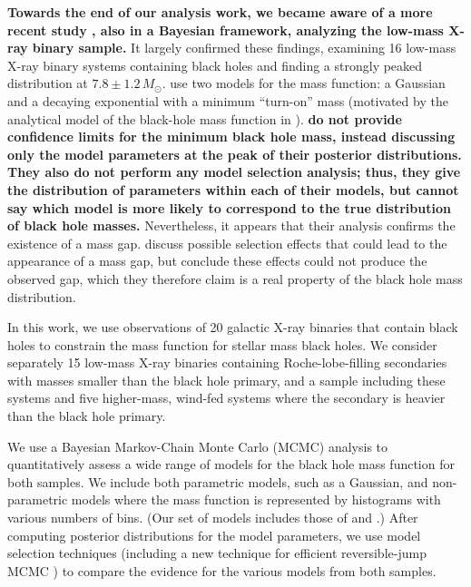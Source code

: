 \documentclass[preprint]{aastex}
\newcommand{\Msun}{M_\odot}
\newcommand{\changed}[1]{{\bf #1 }}
\begin{document}
\changed{Towards the end of our analysis work, we became aware of a
  more recent study \citep{Ozel2010}, also in a Bayesian framework,
  analyzing the low-mass X-ray binary sample.}  It largely confirmed
these findings, examining 16 low-mass X-ray binary systems containing
black holes and finding a strongly peaked distribution at $7.8 \pm 1.2
\, \Msun$.  \citet{Ozel2010} use two models for the mass function: a
Gaussian and a decaying exponential with a minimum ``turn-on'' mass
(motivated by the analytical model of the black-hole mass function in
\citet{Fryer2001}).  \changed{\citet{Ozel2010} do not provide
  confidence limits for the minimum black hole mass, instead
  discussing only the model parameters at the peak of their posterior
  distributions.  They also do not perform any model selection
  analysis; thus, they give the distribution of parameters within each
  of their models, but cannot say which model is more likely to
  correspond to the true distribution of black hole masses.}
Nevertheless, it appears that their analysis confirms the existence of
a mass gap.  \citet{Ozel2010} discuss possible selection effects that
could lead to the appearance of a mass gap, but conclude these effects
could not produce the observed gap, which they therefore claim is a
real property of the black hole mass distribution.

In this work, we use observations of 20 galactic X-ray binaries that
contain black holes to constrain the mass function for stellar mass
black holes.  We consider separately 15 low-mass X-ray binaries
containing Roche-lobe-filling secondaries with masses smaller than the
black hole primary, and a sample including these systems and five
higher-mass, wind-fed systems where the secondary is heavier than the
black hole primary.

We use a Bayesian Markov-Chain Monte Carlo (MCMC) analysis to
quantitatively assess a wide range of models for the black hole mass
function for both samples.  We include both parametric models, such
as a Gaussian, and non-parametric models where the mass function is
represented by histograms with various numbers of bins.  (Our set of
models includes those of \citet{Ozel2010} and \citet{Bailyn1998}.)
After computing posterior distributions for the model parameters, we
use model selection techniques (including a new technique for
efficient reversible-jump MCMC \citep{Farr2010}) to compare the
evidence for the various models from both samples.
\end{document}
